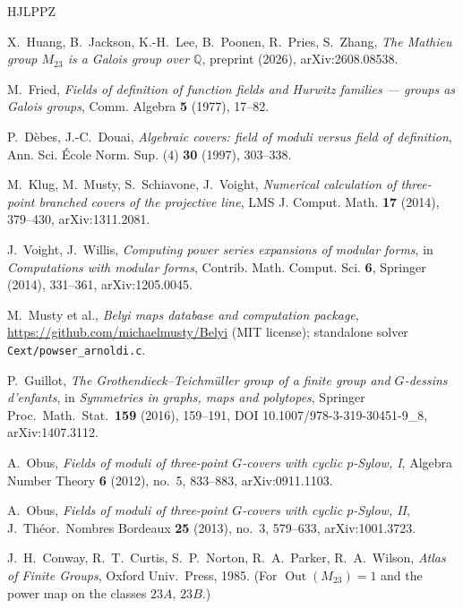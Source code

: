 \documentclass[11pt]{amsart}
\newcommand{\Mtw}{M_{23}}
\theoremstyle{plain}
\theoremstyle{definition}
\begin{document}
\begin{thebibliography}{HJLPPZ}

X.~Huang, B.~Jackson, K.-H.~Lee, B.~Poonen, R.~Pries, S.~Zhang,
\emph{The Mathieu group $M_{23}$ is a Galois group over
$\mathbb{Q}$}, preprint (2026), arXiv:2608.08538.

M.~Fried, \emph{Fields of definition of function fields and Hurwitz
families --- groups as Galois groups}, Comm. Algebra \textbf{5}
(1977), 17--82.

P.~D\`ebes, J.-C.~Douai, \emph{Algebraic covers: field of moduli
versus field of definition}, Ann. Sci. \'Ecole Norm. Sup. (4)
\textbf{30} (1997), 303--338.

M.~Klug, M.~Musty, S.~Schiavone, J.~Voight, \emph{Numerical
calculation of three-point branched covers of the projective line},
LMS J. Comput. Math. \textbf{17} (2014), 379--430, arXiv:1311.2081.

J.~Voight, J.~Willis, \emph{Computing power series expansions of
modular forms}, in \emph{Computations with modular forms}, Contrib.
Math. Comput. Sci. \textbf{6}, Springer (2014), 331--361,
arXiv:1205.0045.

M.~Musty et al., \emph{Belyi maps database and computation package},
\url{https://github.com/michaelmusty/Belyi} (MIT license); standalone
solver \texttt{Cext/powser\_arnoldi.c}.

P.~Guillot, \emph{The Grothendieck--Teichm\"uller group of a finite
group and $G$-dessins d'enfants}, in \emph{Symmetries in graphs,
maps and polytopes}, Springer Proc.\ Math.\ Stat.\ \textbf{159}
(2016), 159--191, DOI 10.1007/978-3-319-30451-9\_8,
arXiv:1407.3112.

A.~Obus, \emph{Fields of moduli of three-point $G$-covers with
cyclic $p$-Sylow, I}, Algebra Number Theory \textbf{6} (2012),
no.~5, 833--883, arXiv:0911.1103.

A.~Obus, \emph{Fields of moduli of three-point $G$-covers with
cyclic $p$-Sylow, II}, J.\ Th\'eor.\ Nombres Bordeaux \textbf{25}
(2013), no.~3, 579--633, arXiv:1001.3723.

J.~H.~Conway, R.~T.~Curtis, S.~P.~Norton, R.~A.~Parker,
R.~A.~Wilson, \emph{Atlas of Finite Groups}, Oxford Univ.\ Press,
1985. (For $\operatorname{Out}(\Mtw)=1$ and the power map on the
classes $23A$, $23B$.)

\end{thebibliography}
\end{document}
